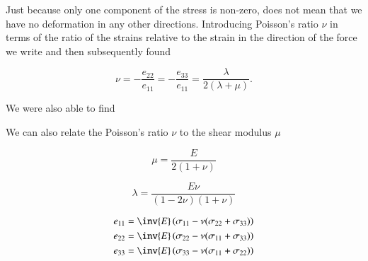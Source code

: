 Just because only one component of the stress is non-zero, does not mean that we have no deformation in any other directions.  Introducing Poisson's ratio $\nu$ in terms of the ratio of the strains relative to the strain in the direction of the force we write and then subsequently found

\begin{equation}\label{eqn:continuumElasticityReview:430}
\nu = -\frac{e_{22}}{e_{11}} = -\frac{e_{33}}{e_{11}} = \frac{\lambda}{2(\lambda + \mu)}.
\end{equation}

We were also able to find

We can also relate the Poisson's ratio $\nu$ to the shear modulus $\mu$

\begin{equation}\label{eqn:continuumElasticityReview:450}
\mu = \frac{E}{2(1 + \nu)}
\end{equation}

\begin{equation}\label{eqn:continuumElasticityReview:470}
\lambda = \frac{E \nu}{(1 - 2 \nu)(1 + \nu)}
\end{equation}

\begin{align}\label{eqn:continuumElasticityReview:490}
e_{11} &= \inv{E}\left( \sigma_{11} - \nu(\sigma_{22} + \sigma_{33}) \right) \\
e_{22} &= \inv{E}\left( \sigma_{22} - \nu(\sigma_{11} + \sigma_{33}) \right) \\
e_{33} &= \inv{E}\left( \sigma_{33} - \nu(\sigma_{11} + \sigma_{22}) \right)
\end{align}

